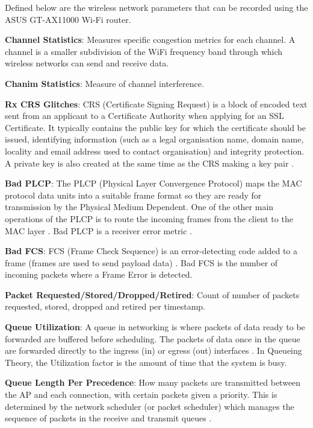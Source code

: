 Defined below are the wireless network parameters that can be recorded using the ASUS GT-AX11000 Wi-Fi router. 

\textbf{Channel Statistics}: Measures specific congestion metrics for each channel. A channel is a smaller subdivision of the WiFi frequency band through which wireless networks can send and receive data.

\textbf{Chanim Statistics}: Measure of channel interference.

\textbf{Rx CRS Glitches}: CRS (Certificate Signing Request) is a block of encoded text sent from an applicant to a Certificate Authority when applying for an SSL Certificate. It typically contains the public key for which the certificate should be issued, identifying information (such as a legal organisation name, domain name, locality and email address used to contact organisation) and integrity protection. A private key is also created at the same time as the CRS making a key pair \cite{CRS}. 

\textbf{Bad PLCP}: The PLCP (Physical Layer Convergence Protocol) maps the MAC protocol data units into a suitable frame format so they are ready for transmission by the Physical Medium Dependent. One of the other main operations of the PLCP is to route the incoming frames from the client to the MAC layer \cite{PLCP}. Bad PLCP is a receiver error metric \cite{PLCPPaper}. 

\textbf{Bad FCS}: FCS (Frame Check Sequence) is an error-detecting code added to a frame (frames are used to send payload data) \cite{FCS}. Bad FCS is the number of incoming packets where a Frame Error is detected. 

\textbf{Packet Requested/Stored/Dropped/Retired}: Count of number of packets requested, stored, dropped and retired per timestamp. 

\textbf{Queue Utilization}: A queue in networking is where packets of data ready to be forwarded are buffered before scheduling. The packets of data once in the queue are forwarded directly to the ingress (in) or egress (out) interfaces \cite{QOSPolicies}. In Queueing Theory, the Utilization factor is the amount of time that the system is busy. 

\textbf{Queue Length Per Precedence}: How many packets are transmitted between the AP and each connection, with certain packets given a priority. This is determined by the network scheduler (or packet scheduler) which manages the sequence of packets in the receive and transmit queues \cite{varghese_2005}. 

